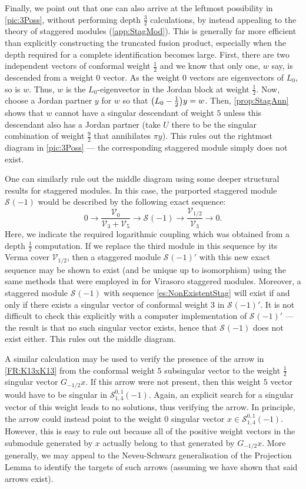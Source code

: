 \documentclass[a4paper,reqno,12pt]{report}
\theoremstyle{definition}
\numberwithin{equation}{section}
\let\originalleft\left     %
\let\originalright\right
\renewcommand{\left}{\mathopen{}\mathclose\bgroup\originalleft}
\renewcommand{\right}{\aftergroup\egroup\originalright}
\newcommand{\brac}[1]{\left( #1 \right)}
\newcommand{\lra}{\longrightarrow}
\newcommand{\Ver}[1]{\mathcal{V}_{#1}}       %
\newcommand{\Stag}[2]{\mathcal{S}_{#1}^{#2}} %
\newcommand{\dses}[5]{0 \lra #1 \overset{#2}{\lra} #3 \overset{#4}{\lra} #5 \lra 0} %
\newcommand{\sv}{singular vector}
\newcommand{\ssv}{subsingular vector}
\newcommand{\ns}{Neveu-Schwarz}
\theoremstyle{plain}
\begin{document}
Finally, we point out that one can also arrive at the leftmost possibility in \eqref{pic:3Poss}, without performing depth $\frac{3}{2}$ calculations, by instead appealing to the theory of staggered modules (\cref{app:StagMod}).  This is generally far more efficient than explicitly constructing the truncated fusion product, especially when the depth required for a complete identification becomes large.  First, there are two independent vectors of conformal weight $\frac{1}{2}$ and we know that only one, $w$ say, is descended from a weight $0$ vector.  As the weight $0$ vectors are eigenvectors of $L_0$, so is $w$.  Thus, $w$ is the $L_0$-eigenvector in the Jordan block at weight $\frac{1}{2}$.  Now, choose a Jordan partner $y$ for $w$ so that $\brac{L_0 - \frac{1}{2}} y = w$.  Then, \cref{prop:StagAnn} shows that $w$ cannot have a singular descendant of weight $5$ unless this descendant also has a Jordan partner (take $U$ there to be the singular combination of weight $\frac{9}{2}$ that annihilates $\pi y$).  This rules out the rightmost diagram in \eqref{pic:3Poss} --- the corresponding staggered module simply does not exist.

One can similarly rule out the middle diagram using some deeper structural results for staggered modules.  In this case, the purported staggered module $\Stag{}{}(-1)$ would be described by the following exact sequence:
\begin{equation} \label{es:NonExistentStag}
\dses{\frac{\Ver{0}}{\Ver{3} + \Ver{5}}}{}{\Stag{}{}(-1)}{}{\frac{\Ver{1/2}}{\Ver{3}}}.
\end{equation}
Here, we indicate the required logarithmic coupling which was obtained from a depth $\frac{1}{2}$ computation.  If we replace the third module in this sequence by its Verma cover $\Ver{1/2}$, then a staggered module $\Stag{}{}(-1)'$ with this new exact sequence may be shown to exist (and be unique up to isomorphism) using the same methods that were employed in \cite{RidSta09} for Virasoro staggered modules.  Moreover, a staggered module $\Stag{}{}(-1)$ with sequence \eqref{es:NonExistentStag} will exist if and only if there exists a \sv{} of conformal weight $3$ in $\Stag{}{}(-1)'$.  It is not difficult to check this explicitly with a computer implementation of $\Stag{}{}(-1)'$ --- the result is that no such \sv{} exists, hence that $\Stag{}{}(-1)$ does not exist either.  This rules out the middle diagram.

A similar calculation may be used to verify the presence of the arrow in \eqref{FR:K13xK13} from the conformal weight $5$ \ssv{} to the weight $\frac{1}{2}$ \sv{} $G_{-1/2} x$.  If this arrow were not present, then this weight $5$ vector would have to be singular in $\Stag{1,4}{0,1}(-1)$.  Again, an explicit search for a \sv{} of this weight leads to no solutions, thus verifying the arrow.  In principle, the arrow could instead point to the weight $0$ \sv{} $x \in \Stag{1,4}{0,1}(-1)$.  However, this is easy to rule out because all of the positive weight vectors in the submodule generated by $x$ actually belong to that generated by $G_{-1/2} x$.  More generally, we may appeal to the \ns{} generalisation of the Projection Lemma \cite[Lem.~5.1]{RidSta09} to identify the targets of such arrows (assuming we have shown that said arrows exist).
\end{document}
